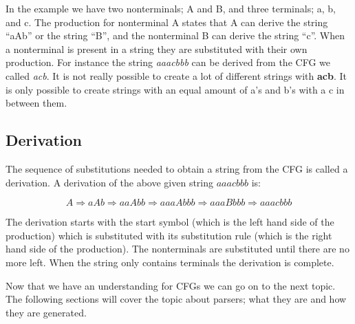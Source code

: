 \begin{center}
	\begin{ebnf}
	\end{ebnf}
\end{center}

In the example we have two nonterminals; A and B, and three terminals; a, b, and c. The production for nonterminal A states that A can derive the string ``aAb'' or the string ``B'', and the nonterminal B can derive the string ``c''. When a nonterminal is present in a string they are substituted with their own production. For instance the string \textit{aaacbbb} can be derived from the CFG we called \textit{acb}. It is not really possible to create a lot of different strings with \textbf{acb}. It is only possible to create strings with an equal amount of a's and b's with a c in between them.

\subsection{Derivation}
The sequence of substitutions needed to obtain a string from the CFG is called a derivation.\cite[p. 100]{itttoc} A derivation of the above given string $aaacbbb$ is:

\[ 
A \Rightarrow aAb \Rightarrow aaAbb \Rightarrow aaaAbbb \Rightarrow aaaBbbb \Rightarrow aaacbbb 
\]

The derivation starts with the start symbol (which is the left hand side of the production) which is substituted with its substitution rule (which is the right hand side of the production). The nonterminals are substituted until there are no more left. When the string only contains terminals the derivation is complete.

Now that we have an understanding for CFGs we can go on to the next topic. The following sections will cover the topic about parsers; what they are and how they are generated.